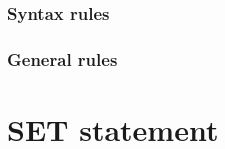 \subsubsection{Syntax rules}

\subsubsection{General rules}

\section{SET statement}

\begin{syntax}
   \identifier {}
  \begin{1=}
    \identifier \\
    \literal \\
    \arithmeticexpression
  \end{1=}
\end{syntax}

\begin{syntax}[\gnucobolcolour]
   \identifier {} 
  \begin{1=}
    \identifier \\
    \literal
  \end{1=}
\end{syntax}

\begin{syntax}[\miscextcolour]
   
  \begin{1=}
    \identifier \\
    \literal
  \end{1=}
  \begin{1=}
    \identifier \\
    \literal
  \end{1=}
\end{syntax}

